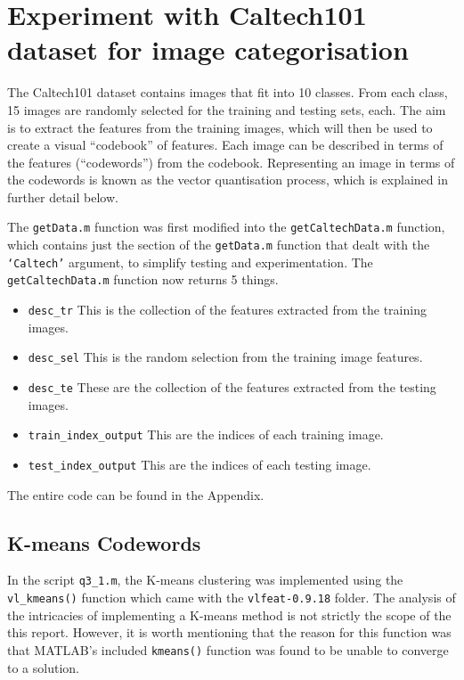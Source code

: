 \documentclass[a4paper, 10pt, conference]{ieeeconf}
\begin{document}
\section{Experiment with Caltech101 dataset for image categorisation}

The Caltech101 dataset contains images that fit into 10 classes. From each class, 15 images are randomly selected for the training and testing sets, each. The aim is to extract the features from the training images, which will then be used to create a visual ``codebook'' of features. Each image can be described in terms of the features (``codewords'') from the codebook. Representing an image in terms of the codewords is known as the vector quantisation process, which is explained in further detail below.

The \texttt{getData.m} function was first modified into the \texttt{getCaltechData.m} function, which contains just the section of the \texttt{getData.m} function that dealt with the \texttt{`Caltech'} argument, to simplify testing and experimentation. The \texttt{getCaltechData.m} function now returns 5 things.

\begin{itemize}
\item \texttt{desc\_tr} This is the collection of the features extracted from the training images.
\item \texttt{desc\_sel} This is the random selection from the training image features.
\item \texttt{desc\_te} These are the collection of the features extracted from the testing images.
\item \texttt{train\_index\_output} This are the indices of each training image.
\item \texttt{test\_index\_output} This are the indices of each testing image.
\end{itemize}

The entire code can be found in the Appendix.

\subsection{K-means Codewords}
In the script \texttt{q3\_1.m}, the K-means clustering was implemented using the \texttt{vl\_kmeans()} function which came with the \texttt{vlfeat-0.9.18} folder. The analysis of the intricacies of implementing a K-means method is not strictly the scope of the this report. However, it is worth mentioning that the reason for this function was that MATLAB's included \texttt{kmeans()} function was found to be unable to converge to a solution.
\end{document}
